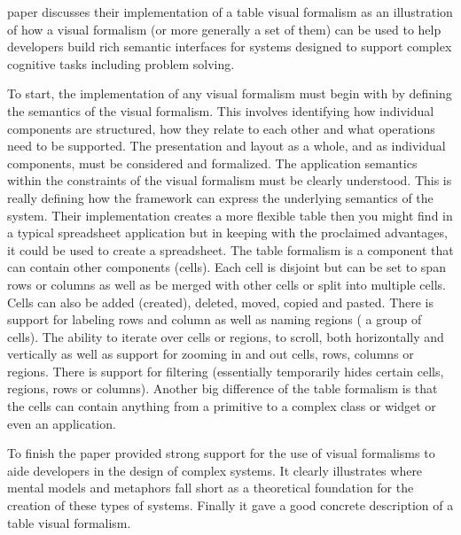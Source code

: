\documentclass{sig-alternate}
\begin{document}
paper discusses their implementation of a table visual formalism as an
illustration of how a visual formalism (or more generally a set of them) can
be used to help developers build rich semantic interfaces for systems designed
to support complex cognitive tasks including
problem solving. 
 
 
To start, the implementation of any visual formalism must
begin with by defining the semantics of the visual formalism. This involves
identifying how individual components are structured, how they relate to each
other and what operations need to be supported. The presentation and layout as a
whole, and as individual components, must be considered and formalized. The
application semantics within the constraints of the visual formalism must be
clearly understood. This is really defining how the framework can express the
underlying semantics of the system. Their implementation creates a more flexible
table then you might find in a typical spreadsheet application but in keeping
with the proclaimed advantages, it could be used to create a
spreadsheet. The table formalism is a component that can contain other
components (cells). Each cell is disjoint but can be set to span rows or columns
as well as be merged with other cells or split into multiple cells. Cells can
also be added (created), deleted, moved, copied and pasted. There is support for
labeling rows and column as well as naming regions ( a group of cells). The
ability to iterate over cells or regions, to scroll, both horizontally and
vertically as well as support for zooming in and out cells, rows, columns or
regions. There is support for filtering (essentially temporarily hides certain
cells, regions, rows or columns). Another big difference of the table formalism
is that the cells can contain anything from a primitive to a complex class or
widget or even an application. 

To finish the paper provided strong support for
the use of visual formalisms to aide developers in the design of complex
systems. It clearly illustrates where mental models and metaphors fall short as
a theoretical foundation for the creation of these types of systems. Finally it
gave a good concrete description of a table visual formalism.
\end{document}
